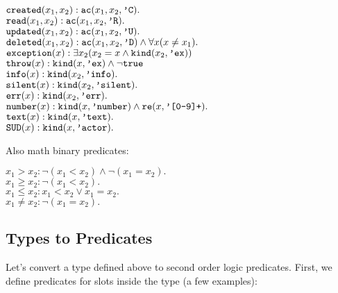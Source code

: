 \documentclass{article}
\begin{document}
        \begin{maths}
        $\mbox{\texttt{created}}(x_1, x_2): \mbox{\texttt{ac}}(x_1, x_2, \mbox{\texttt{'C}}). $ \\
        $\mbox{\texttt{read}}(x_1, x_2): \mbox{\texttt{ac}}(x_1, x_2, \mbox{\texttt{'R}}). $ \\
        $\mbox{\texttt{updated}}(x_1, x_2): \mbox{\texttt{ac}}(x_1, x_2, \mbox{\texttt{'U}}). $ \\
        $\mbox{\texttt{deleted}}(x_1, x_2): \mbox{\texttt{ac}}(x_1, x_2, \mbox{\texttt{'D}}) \wedge \forall x (x \neq x_1). $ \\
        $\mbox{\texttt{exception}}(x): \exists x_2 (x_2 = x \wedge \mbox{\texttt{kind}}(x_2, \mbox{\texttt{'ex}}))$ \\
        $\mbox{\texttt{throw}}(x): \mbox{\texttt{kind}}(x, \mbox{\texttt{'ex}}) \wedge \neg \mbox{\texttt{true}}$ \\
        $\mbox{\texttt{info}}(x): \mbox{\texttt{kind}}(x_2, \mbox{\texttt{'info}}). $ \\
        $\mbox{\texttt{silent}}(x): \mbox{\texttt{kind}}(x_2, \mbox{\texttt{'silent}}). $ \\
        $\mbox{\texttt{err}}(x): \mbox{\texttt{kind}}(x_2, \mbox{\texttt{'err}}). $ \\
        $\mbox{\texttt{number}}(x): \mbox{\texttt{kind}}(x, \mbox{\texttt{'number}}) \wedge \mbox{\texttt{re}}(x, \mbox{\texttt{'[0-9]+}}).$ \\
        $\mbox{\texttt{text}}(x): \mbox{\texttt{kind}}(x, \mbox{\texttt{'text}}).$ \\
        $\mbox{\texttt{SUD}}(x): \mbox{\texttt{kind}}(x, \mbox{\texttt{'actor}}).$ \\
        \end{maths}
        
        Also math binary predicates:

        \begin{maths}
        $x_1 > x_2: \neg(x_1 < x_2) \wedge \neg(x_1 = x_2). $ \\
        $x_1 \geq x_2: \neg (x_1 < x_2). $ \\
        $x_1 \leq x_2: x_1 < x_2 \vee x_1 = x_2. $ \\
        $x_1 \neq x_2: \neg (x_1 = x_2). $ \\
        \end{maths}
        
    \subsection{Types to Predicates}
    
        Let's convert a type defined above to second order logic predicates.
        First, we define predicates for slots inside the type (a few examples):
        
\end{document}
